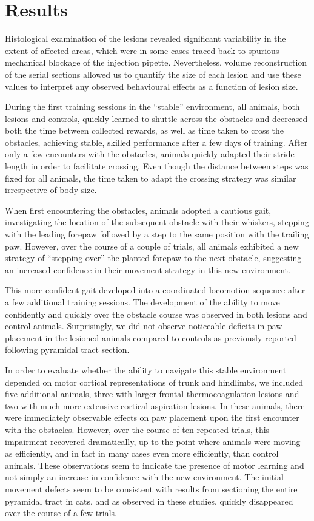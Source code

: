 \section{Results}

Histological examination of the lesions revealed significant variability in the extent of affected areas, which were in some cases traced back to spurious mechanical blockage of the injection pipette. Nevertheless, volume reconstruction of the serial sections allowed us to quantify the size of each lesion and use these values to interpret any observed behavioural effects as a function of lesion size.

During the first training sessions in the ``stable'' environment, all animals, both lesions and controls, quickly learned to shuttle across the obstacles and decreased both the time between collected rewards, as well as time taken to cross the obstacles, achieving stable, skilled performance after a few days of training. After only a few encounters with the obstacles, animals quickly adapted their stride length in order to facilitate crossing. Even though the distance between steps was fixed for all animals, the time taken to adapt the crossing strategy was similar irrespective of body size.

When first encountering the obstacles, animals adopted a cautious gait, investigating the location of the subsequent obstacle with their whiskers, stepping with the leading forepaw followed by a step to the same position with the trailing paw. However, over the course of a couple of trials, all animals exhibited a new strategy of ``stepping over'' the planted forepaw to the next obstacle, suggesting an increased confidence in their movement strategy in this new environment.

This more confident gait developed into a coordinated locomotion sequence after a few additional training sessions. The development of the ability to move confidently and quickly over the obstacle course was observed in both lesions and control animals. Surprisingly, we did not observe noticeable deficits in paw placement in the lesioned animals compared to controls as previously reported following pyramidal tract section.

In order to evaluate whether the ability to navigate this stable environment depended on motor cortical representations of trunk and hindlimbs, we included five additional animals, three with larger frontal thermocoagulation lesions and two with much more extensive cortical aspiration lesions. In these animals, there were immediately observable effects on paw placement upon the first encounter with the obstacles. However, over the course of ten repeated trials, this impairment recovered dramatically, up to the point where animals were moving as efficiently, and in fact in many cases even more efficiently, than control animals. These observations seem to indicate the presence of motor learning and not simply an increase in confidence with the new environment. The initial movement defects seem to be consistent with results from sectioning the entire pyramidal tract in cats, and as observed in these studies, quickly disappeared over the course of a few trials.


